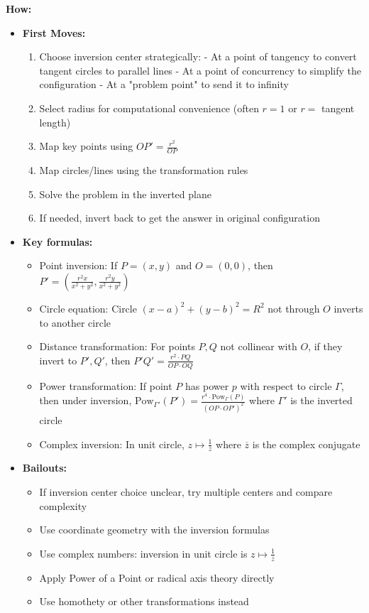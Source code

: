 \documentclass[12pt]{article}
\begin{document}
\textbf{How:}
\begin{itemize}
    \item \textbf{First Moves:} 
    \begin{enumerate}
        \item Choose inversion center strategically:
            - At a point of tangency to convert tangent circles to parallel lines
            - At a point of concurrency to simplify the configuration
            - At a "problem point" to send it to infinity
        \item Select radius for computational convenience (often $r=1$ or $r=$ tangent length)
        \item Map key points using $OP' = \frac{r^2}{OP}$
        \item Map circles/lines using the transformation rules
        \item Solve the problem in the inverted plane
        \item If needed, invert back to get the answer in original configuration
    \end{enumerate}
    
    \item \textbf{Key formulas:}
    \begin{itemize}
        \item Point inversion: If $P = (x,y)$ and $O = (0,0)$, then $P' = \left(\frac{r^2x}{x^2+y^2}, \frac{r^2y}{x^2+y^2}\right)$
        \item Circle equation: Circle $(x-a)^2 + (y-b)^2 = R^2$ not through $O$ inverts to another circle
        \item Distance transformation: For points $P, Q$ not collinear with $O$, if they invert to $P', Q'$, then $P'Q' = \frac{r^2 \cdot PQ}{OP \cdot OQ}$
        \item Power transformation: If point $P$ has power $p$ with respect to circle $\Gamma$, then under inversion, $\text{Pow}_{\Gamma'}(P') = \frac{r^4 \cdot \text{Pow}_{\Gamma}(P)}{(OP \cdot OP')^2}$ where $\Gamma'$ is the inverted circle
        \item Complex inversion: In unit circle, $z \mapsto \frac{1}{\overline{z}}$ where $\overline{z}$ is the complex conjugate
    \end{itemize}
    
    \item \textbf{Bailouts:} 
    \begin{itemize}
        \item If inversion center choice unclear, try multiple centers and compare complexity
        \item Use coordinate geometry with the inversion formulas
        \item Use complex numbers: inversion in unit circle is $z \mapsto \frac{1}{\overline{z}}$
        \item Apply Power of a Point or radical axis theory directly
        \item Use homothety or other transformations instead
    \end{itemize}
    

\end{itemize}
\end{document}
